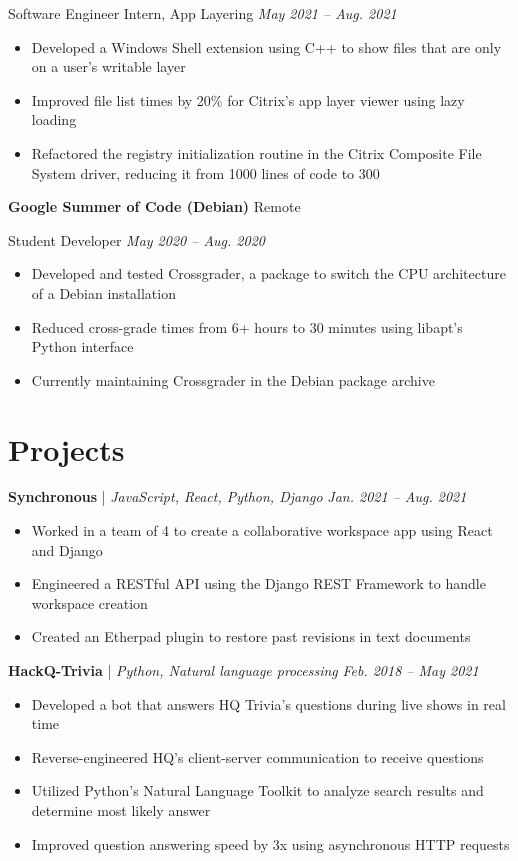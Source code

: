 \documentclass[11pt,letterpaper]{article}
\newcommand{\resumeItemListStart}{
    \begin{itemize}[itemsep=1pt, parsep=0pt, topsep=0pt]
}
\newcommand{\resumeItemListEnd}{
    \end{itemize}
}
\begin{document}
Software Engineer Intern, App Layering \hfill \textit{May 2021 -- Aug. 2021}

\resumeItemListStart
	\item Developed a Windows Shell extension using C++ to show files that are only on a user's writable layer
	\item Improved file list times by 20\% for Citrix's app layer viewer using lazy loading
	\item Refactored the registry initialization routine in the Citrix Composite File System driver, reducing it from 1000 lines of code to 300
\resumeItemListEnd

\textbf{Google Summer of Code (Debian)} \hfill Remote

Student Developer \hfill \textit{May 2020 -- Aug. 2020}

\resumeItemListStart
	\item Developed and tested Crossgrader, a package to switch the CPU architecture of a Debian installation
	\item Reduced cross-grade times from 6+ hours to 30 minutes using libapt's Python interface
    \item Currently maintaining Crossgrader in the Debian package archive
\resumeItemListEnd

\section{Projects}

\textbf{Synchronous} | \emph{JavaScript, React, Python, Django} \hfill \textit{Jan. 2021 -- Aug. 2021}

\resumeItemListStart
    \item Worked in a team of 4 to create a collaborative workspace app using React and Django
    \item Engineered a RESTful API using the Django REST Framework to handle workspace creation
    \item Created an Etherpad plugin to restore past revisions in text documents
\resumeItemListEnd

\textbf{HackQ-Trivia} | \emph{Python, Natural language processing} \hfill \textit{Feb. 2018 -- May 2021}

\resumeItemListStart
    \item Developed a bot that answers HQ Trivia's questions during live shows in real time
	\item Reverse-engineered HQ's client-server communication to receive questions
	\item Utilized Python's Natural Language Toolkit to analyze search results and determine most likely answer
	\item Improved question answering speed by 3x using asynchronous HTTP requests
\resumeItemListEnd
\end{document}
